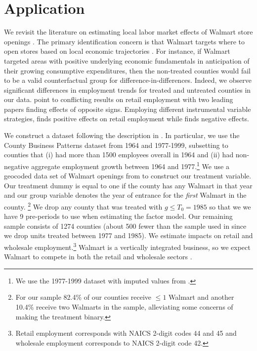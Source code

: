 \documentclass[12pt]{article}
\begin{document}
\section{Application}\label{sec:application}

We revisit the literature on estimating local labor market effects of Walmart store openings \citep{basker2005job, neumark2008effects, volpe2022economic}. The primary identification concern is that Walmart targets where to open stores based on local economic trajectories \citep{neumark2008effects}. For instance, if Walmart targeted areas with positive underlying economic fundamentals in anticipation of their growing consumptive expenditures, then the non-treated counties would fail to be a valid counterfactual group for difference-in-differences. Indeed, we observe significant differences in employment trends for treated and untreated counties in our data. \citet{volpe2022economic} point to conflicting results on retail employment with two leading papers finding effects of opposite signs. Employing different instrumental variable strategies, \citet{basker2005job} finds positive effects on retail employment while \citet{neumark2008effects} finds negative effects.

We construct a dataset following the description in \citet{basker2005job}. In particular, we use the County Business Patterns dataset from 1964 and 1977-1999, subsetting to counties that (i) had more than 1500 employees overall in 1964 and (ii) had non-negative aggregate employment growth between 1964 and 1977.\footnote{We use the 1977-1999 dataset with imputed values from \citet{eckert2021imputing}.} We use a geocoded data set of Walmart openings from \citet{arcidiacono2020competitive} to construct our treatment variable. Our treatment dummy is equal to one if the county has any Walmart in that year and our group variable denotes the year of entrance for the \emph{first} Walmart in the county. \footnote{For our sample 82.4\% of our counties receive $\leq 1$ Walmart and another 10.4\% receive two Walmarts in the sample, alleviating some concerns of making the treatment binary.} We drop any county that was treated with $g \leq T_0 = 1985$ so that we we have 9 pre-periods to use when estimating the factor model. Our remaining sample consists of 1274 counties (about 500 fewer than the sample used in \citet{basker2005job} since we drop units treated between 1977 and 1985). We estimate impacts on retail and wholesale employment.\footnote{Retail employment corresponds with NAICS 2-digit codes 44 and 45 and wholesale employment corresponds to NAICS 2-digit code 42.} Walmart is a vertically integrated business, so we expect Walmart to compete in both the retail and wholesale sectors \citep{basker2005job}.
\end{document}
